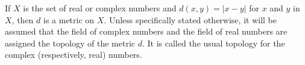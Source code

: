 If $X$ is the set of real or complex numbers and $d(x,y) = |x - y|$ for $x$ and $y$ in $X$, then $d$ is a metric on $X$. Unless specifically stated otherwise, it will be assumed that the field of complex numbers and the field of real numbers are assigned the topology of the metric $d$. It is called the usual topology for the complex (respectively, real) numbers.
